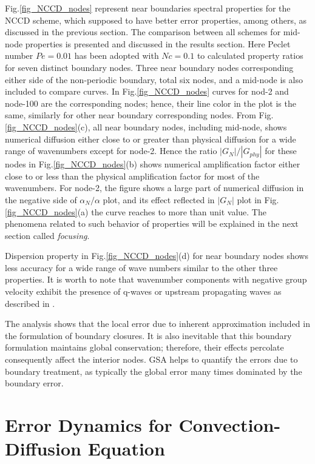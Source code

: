 \documentclass[showpacs,preprintnumbers,amsmath,amssymb]{revtex4-1} %
\begin{document}
Fig.\ref{fig_NCCD_nodes} represent near boundaries spectral properties for the NCCD scheme, which supposed to have better error properties, among others, as discussed in the previous section. The comparison between all schemes for mid-node properties is presented and discussed in the results section. Here Peclet number $Pe=0.01$ has been adopted with $Nc=0.1$ to calculated property ratios for seven distinct boundary nodes. Three near boundary nodes corresponding either side of the non-periodic boundary, total six nodes, and a mid-node is also included to compare curves. In Fig.\ref{fig_NCCD_nodes} curves for nod-2 and node-100 are the corresponding nodes; hence, their line color in the plot is the same, similarly for other near boundary corresponding nodes. From Fig.\ref{fig_NCCD_nodes}(c), all near boundary nodes, including mid-node, shows numerical diffusion either close to or greater than physical diffusion for a wide range of wavenumbers except for node-2. Hence the ratio $|G_N|/|G_{phy}|$ for these nodes in Fig.\ref{fig_NCCD_nodes}(b) shows numerical amplification factor either close to or less than the physical amplification factor for most of the wavenumbers. For node-2, the figure shows a large part of numerical diffusion in the negative side of $\alpha_N/\alpha$ plot, and its effect reflected in $|G_N|$ plot in Fig.\ref{fig_NCCD_nodes}(a) the curve reaches to more than unit value. The phenomena related to such behavior of properties will be explained in the next section called \textit{focusing}.

Dispersion property in Fig.\ref{fig_NCCD_nodes}(d) for near boundary nodes shows less accuracy for a wide range of wave numbers similar to the other three properties. It is worth to note that wavenumber components with negative group velocity exhibit the presence of q-waves or upstream propagating waves as described in \cite{SUMAN_et_al}.

The analysis shows that the local error due to inherent approximation included in the formulation of boundary closures. It is also inevitable that this boundary formulation maintains global conservation; therefore, their effects percolate consequently affect the interior nodes. GSA helps to quantify the errors due to boundary treatment, as typically the global error many times dominated by the boundary error.

\section{Error Dynamics for Convection-Diffusion Equation}
\end{document}
